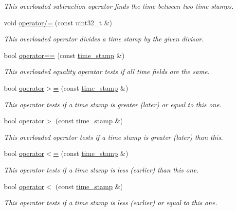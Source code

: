 \begin{DoxyCompactItemize}
\begin{DoxyCompactList}\small\item\em This overloaded subtraction operator finds the time between two time stamps. \end{DoxyCompactList}\item 
void \hyperlink{classtime__stamp_a094dabe4f6f65965c19ec2c254deff89}{operator/=} (const uint32\-\_\-t \&)
\begin{DoxyCompactList}\small\item\em This overloaded operator divides a time stamp by the given divisor. \end{DoxyCompactList}\item 
bool \hyperlink{classtime__stamp_a1ab1b1ef8750d35c4496b5a55dba722e}{operator==} (const \hyperlink{classtime__stamp}{time\-\_\-stamp} \&)
\begin{DoxyCompactList}\small\item\em This overloaded equality operator tests if all time fields are the same. \end{DoxyCompactList}\item 
bool \hyperlink{classtime__stamp_ae5916b8c7a36aeea1e8b3ca8433a8411}{operator$>$=} (const \hyperlink{classtime__stamp}{time\-\_\-stamp} \&)
\begin{DoxyCompactList}\small\item\em This operator tests if a time stamp is greater (later) or equal to this one. \end{DoxyCompactList}\item 
bool \hyperlink{classtime__stamp_a498c5e081bc44c2d1633c586623f5efd}{operator$>$} (const \hyperlink{classtime__stamp}{time\-\_\-stamp} \&)
\begin{DoxyCompactList}\small\item\em This overloaded operator tests if a time stamp is greater (later) than this. \end{DoxyCompactList}\item 
bool \hyperlink{classtime__stamp_a3e21854f649ab9b1faf17f7d35176b8d}{operator$<$=} (const \hyperlink{classtime__stamp}{time\-\_\-stamp} \&)
\begin{DoxyCompactList}\small\item\em This operator tests if a time stamp is less (earlier) than this one. \end{DoxyCompactList}\item 
bool \hyperlink{classtime__stamp_ae8a1b4f6e4f00cf096c662ff9eb7bfb5}{operator$<$} (const \hyperlink{classtime__stamp}{time\-\_\-stamp} \&)
\begin{DoxyCompactList}\small\item\em This operator tests if a time stamp is less (earlier) or equal to this one. \end{DoxyCompactList}\end{DoxyCompactItemize}
